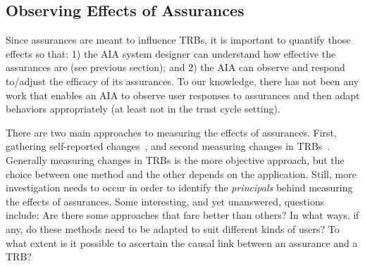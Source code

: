 \subsection{Observing Effects of Assurances} \label{sec:measuring_effects}
    Since assurances are meant to influence TRBs, it is important to quantify those effects so that:  1) the AIA system designer can understand how effective the assurances are (see previous section); and 2) the AIA can observe and respond to/adjust the efficacy of its assurances. To our knowledge, there has not been any work that enables an AIA to observe user responses to assurances and then adapt behaviors appropriately (at least not in the trust cycle setting). 

    There are two main approaches to measuring the effects of assurances. First, gathering self-reported changes~\cite{Mcknight2011-gv,Muir1996-gt,Wickens1999-la,Salem2015-md,Kaniarasu2013-ho}, and second measuring changes in TRBs~\cite{Freedy2007-sg,Desai2012-rc,Salem2015-md,Wu2016-ei,Bainbridge2011-pl}. Generally measuring changes in TRBs is the more objective approach, but the choice between one method and the other depends on the application. Still, more investigation needs to occur in order to identify the \emph{principals} behind measuring the effects of assurances. Some interesting, and yet unanswered, questions include: Are there some approaches that fare better than others? In what ways, if any, do these methods need to be adapted to suit different kinds of users? To what extent is it possible to ascertain the causal link between an assurance and a TRB?
